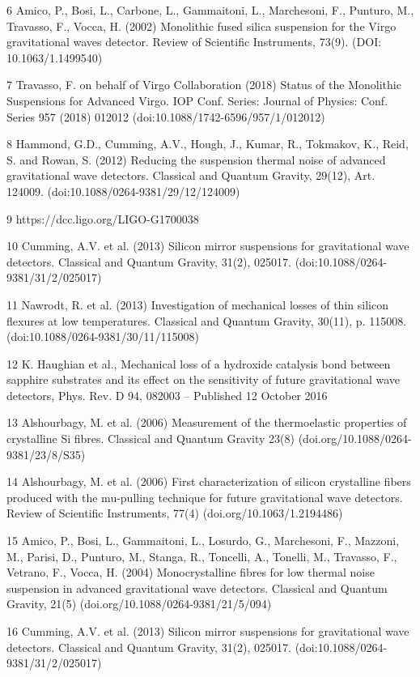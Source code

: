 6 Amico, P., Bosi, L., Carbone, L., Gammaitoni, L., Marchesoni, F., Punturo, M., Travasso, F., Vocca, H. (2002) Monolithic fused silica suspension for the Virgo gravitational waves detector. Review of Scientific Instruments, 73(9). (DOI: 10.1063/1.1499540)

7 Travasso, F. on behalf of Virgo Collaboration (2018) Status of the Monolithic Suspensions for Advanced Virgo. IOP Conf. Series: Journal of Physics: Conf. Series 957 (2018) 012012  (doi:10.1088/1742-6596/957/1/012012)

8 Hammond, G.D., Cumming, A.V., Hough, J., Kumar, R., Tokmakov, K., Reid, S. and Rowan, S. (2012) Reducing the suspension thermal noise of advanced gravitational wave detectors. Classical and Quantum Gravity, 29(12), Art. 124009. (doi:10.1088/0264-9381/29/12/124009)

9 https://dcc.ligo.org/LIGO-G1700038

10 Cumming, A.V. et al. (2013) Silicon mirror suspensions for gravitational wave detectors. Classical and Quantum Gravity, 31(2), 025017. (doi:10.1088/0264-9381/31/2/025017)

11 Nawrodt, R. et al. (2013) Investigation of mechanical losses of thin silicon flexures at low temperatures. Classical and Quantum Gravity, 30(11), p. 115008. (doi:10.1088/0264-9381/30/11/115008)

12 K. Haughian et al., Mechanical loss of a hydroxide catalysis bond between sapphire substrates and its effect on the sensitivity of future gravitational wave detectors, Phys. Rev. D 94, 082003 – Published 12 October 2016

13 Alshourbagy, M. et al. (2006) Measurement of the thermoelastic properties of crystalline Si fibres. Classical and Quantum Gravity 23(8) (doi.org/10.1088/0264-9381/23/8/S35)

14 Alshourbagy, M. et al. (2006) First characterization of silicon crystalline fibers produced with the mu-pulling technique for future gravitational wave detectors. Review of Scientific Instruments, 77(4) (doi.org/10.1063/1.2194486)

15 Amico, P., Bosi, L., Gammaitoni, L., Losurdo, G., Marchesoni, F., Mazzoni, M., Parisi, D., Punturo, M., Stanga, R., Toncelli, A., Tonelli, M., Travasso, F., Vetrano, F., Vocca, H. (2004) Monocrystalline fibres for low thermal noise suspension in advanced gravitational wave detectors. Classical and Quantum Gravity, 21(5) (doi.org/10.1088/0264-9381/21/5/094)

16 Cumming, A.V. et al. (2013) Silicon mirror suspensions for gravitational wave detectors. Classical and Quantum Gravity, 31(2), 025017. (doi:10.1088/0264-9381/31/2/025017)


